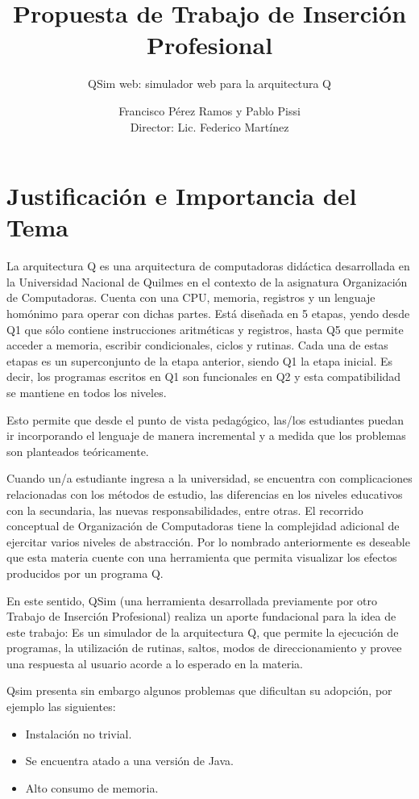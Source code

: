 \documentclass[a4paper,10pt]{article}
\title{Propuesta de Trabajo de Inserción Profesional}
\subtitle{QSim web: simulador web para la arquitectura Q}
\author{Francisco Pérez Ramos y Pablo Pissi \\ Director: Lic. Federico Martínez}
\date{}
\begin{document}
\maketitle
  
\section*{Justificación e Importancia del Tema}
La arquitectura Q es una arquitectura de computadoras didáctica desarrollada en la Universidad Nacional de Quilmes en el contexto de la asignatura Organización de Computadoras. Cuenta con una CPU, memoria, registros y un lenguaje homónimo para operar con dichas partes.
Está diseñada en 5 etapas, yendo desde Q1 que sólo contiene instrucciones aritméticas y registros, hasta Q5 que permite acceder a memoria, escribir condicionales, ciclos y rutinas. Cada una de estas etapas es un superconjunto de la etapa anterior, siendo Q1 la etapa inicial. Es decir, los programas escritos en Q1 son funcionales en Q2 y esta compatibilidad se mantiene en todos los niveles.

Esto permite que desde el punto de vista pedagógico, las/los estudiantes puedan ir incorporando el lenguaje de manera incremental y a medida que los problemas son planteados teóricamente.

Cuando un/a estudiante ingresa a la universidad, se encuentra con complicaciones relacionadas con los métodos de estudio, las diferencias en los niveles educativos con la secundaria, las nuevas responsabilidades, entre otras. El recorrido conceptual de Organización de Computadoras tiene la complejidad adicional de ejercitar varios niveles de abstracción. Por lo nombrado anteriormente es deseable que esta materia cuente con una herramienta que permita visualizar los efectos producidos por un programa Q.

En este sentido, QSim (una herramienta desarrollada previamente por otro Trabajo de Inserción Profesional) realiza un aporte fundacional para la idea de este trabajo: Es un simulador de la arquitectura Q, que permite la ejecución de programas, la utilización de rutinas, saltos, modos de direccionamiento y provee una respuesta al usuario acorde a lo esperado en la materia.

Qsim presenta sin embargo algunos problemas que dificultan su adopción, por ejemplo las siguientes:

\begin{itemize}

\item Instalación no trivial. 

\item Se encuentra atado a una versión de Java. 

\item Alto consumo de memoria. 
\end{itemize}
\end{document}

